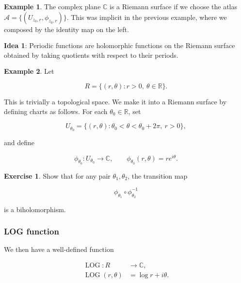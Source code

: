 \documentclass[
]{book}
\theoremstyle{definition}
\theoremstyle{definition}
\newtheorem{example}{Example}[chapter]
\theoremstyle{definition}
\newtheorem{exercise}{Exercise}[chapter]
\theoremstyle{definition}
\theoremstyle{remark}
\begin{document}
\medskip

\begin{example}
\protect\hypertarget{exm:unnamed-chunk-15}{}\label{exm:unnamed-chunk-15}The complex plane \(\mathbb{C}\) is a Riemann surface if we choose the atlas
\(\mathcal{A} = \{ (U_{z_0,r}, \phi_{z_0,r}) \}\).
This was implicit in the previous example, where we composed by the identity
map on the left.
\end{example}

\textbf{Idea 1}: Periodic functions are holomorphic functions on the Riemann surface obtained by taking quotients with respect to their periods.

\begin{example}
\protect\hypertarget{exm:unnamed-chunk-16}{}\label{exm:unnamed-chunk-16}Let

\[
R = \{(r,\theta) : r > 0,\ \theta \in \mathbb{R}\}.
\]

This is trivially a topological space. We make it into a Riemann surface by
defining charts as follows. For each \(\theta_0 \in \mathbb{R}\), set

\[
U_{\theta_0}
= \{(r,\theta) : \theta_0 < \theta < \theta_0 + 2\pi,\ r > 0\},
\]

and define

\[
\phi_{\theta_0} : U_{\theta_0} \to \mathbb{C}, \qquad
\phi_{\theta_0}(r,\theta) = r e^{i\theta}.
\]
\end{example}

\medskip

\begin{exercise}
\protect\hypertarget{exr:unnamed-chunk-17}{}\label{exr:unnamed-chunk-17}Show that for any pair \(\theta_1, \theta_2\), the transition map

\[
\phi_{\theta_1} \circ \phi_{\theta_2}^{-1}
\]

is a biholomorphism.
\end{exercise}

\subsubsection{LOG function}\label{log-function}

We then have a well-defined function

\begin{align}
\operatorname{LOG} : R &\to \mathbb{C}, \\
\operatorname{LOG}(r,\theta) &= \log r + i\theta.
\end{align}
\end{document}
